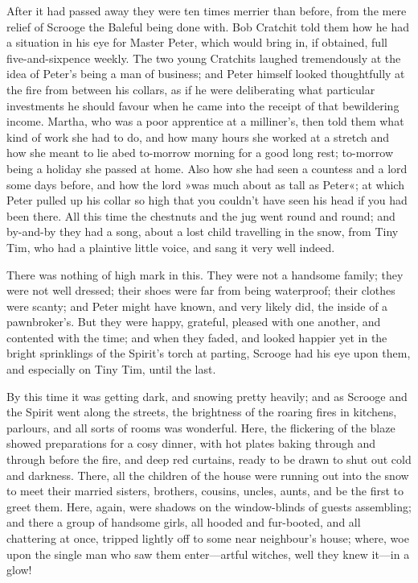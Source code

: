 After it had passed away they were ten times merrier than before, from the mere relief of Scrooge the Baleful being done with. Bob Cratchit told them how he had a situation in his eye for Master Peter, which would bring in, if obtained, full five-and-sixpence weekly. The two young Cratchits laughed tremendously at the idea of Peter's being a man of business; and Peter himself looked thoughtfully at the fire from between his collars, as if he were deliberating what particular investments he should favour when he came into the receipt of that bewildering income. Martha, who was a poor apprentice at a milliner's, then told them what kind of work she had to do, and how many hours she worked at a stretch and how she meant to lie abed to-morrow morning for a good long rest; to-morrow being a holiday she passed at home. Also how she had seen a countess and a lord some days before, and how the lord »was much about as tall as Peter«; at which Peter pulled up his collar so high that you couldn't have seen his head if you had been there. All this time the chestnuts and the jug went round and round; and by-and-by they had a song, about a lost child travelling in the snow, from Tiny Tim, who had a plaintive little voice, and sang it very well indeed.

There was nothing of high mark in this. They were not a handsome family; they were not well dressed; their shoes were far from being waterproof; their clothes were scanty; and Peter might have known, and very likely did, the inside of a pawnbroker's. But they were happy, grateful, pleased with one another, and contented with the time; and when they faded, and looked happier yet in the bright sprinklings of the Spirit's torch at parting, Scrooge had his eye upon them, and especially on Tiny Tim, until the last.

By this time it was getting dark, and snowing pretty heavily; and as Scrooge and the Spirit went along the streets, the brightness of the roaring fires in kitchens, parlours, and all sorts of rooms was wonderful. Here, the flickering of the blaze showed preparations for a cosy dinner, with hot plates baking through and through before the fire, and deep red curtains, ready to be drawn to shut out cold and darkness. There, all the children of the house were running out into the snow to meet their married sisters, brothers, cousins, uncles, aunts, and be the first to greet them. Here, again, were shadows on the window-blinds of guests assembling; and there a group of handsome girls, all hooded and fur-booted, and all chattering at once, tripped lightly off to some near neighbour's house; where, woe upon the single man who saw them enter—artful witches, well they knew it—in a glow!

